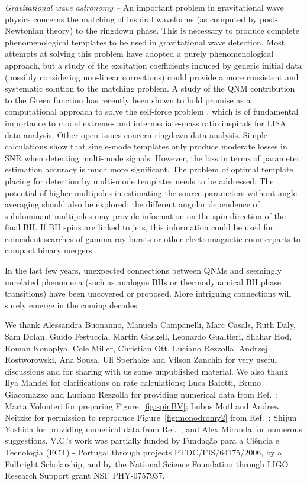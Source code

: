 \documentclass[]{iopart}
\begin{document}
\noindent
{\it Gravitational wave astronomy --} An important problem in gravitational
wave physics concerns the matching of inspiral waveforms (as computed by
post-Newtonian theory) to the ringdown phase. This is necessary to produce
complete phenomenological templates to be used in gravitational wave
detection. Most attempts at solving this problem have adopted a purely
phenomenological approach, but a study of the excitation coefficients induced
by generic initial data (possibly considering non-linear corrections) could
provide a more consistent and systematic solution to the matching problem. A
study of the QNM contribution to the Green function has recently been shown to
hold promise as a computational approach to solve the self-force problem
\cite{Casals:2009zh}, which is of fundamental importance to model extreme- and
intermediate-mass ratio inspirals for LISA data analysis. Other open issues
concern ringdown data analysis. Simple calculations show that single-mode
templates only produce moderate losses in SNR when detecting multi-mode
signals. However, the loss in terms of parameter estimation accuracy is much
more significant. The problem of optimal template placing for detection by
multi-mode templates needs to be addressed. The potential of higher multipoles
in estimating the source parameters without angle-averaging should also be
explored: the different angular dependence of subdominant multipoles may
provide information on the spin direction of the final BH. If BH spins are
linked to jets, this information could be used for coincident searches of
gamma-ray bursts or other electromagnetic counterparts to compact binary
mergers \cite{Kanner:2008zh,Bloom:2009vx}.

In the last few years, unexpected connections between QNMs and seemingly
unrelated phenomena (such as analogue BHs or thermodynamical BH phase
transitions) have been uncovered or proposed. More intriguing connections will
surely emerge in the coming decades.

\ack

We thank Alessandra Buonanno, Manuela Campanelli, Marc Casals, Ruth Daly, Sam
Dolan, Guido Festuccia, Martin Gaskell, Leonardo Gualtieri, Shahar Hod, Roman Konoplya, Cole
Miller, Christian Ott, Luciano Rezzolla, Andrzej Rostworowski, Ana Sousa, Uli
Sperhake and Vilson Zanchin for very useful discussions and for sharing with
us some unpublished material.  We also thank Ilya Mandel for clarifications on
rate calculations; Luca Baiotti, Bruno Giacomazzo and Luciano Rezzolla for
providing numerical data from Ref.~\cite{Baiotti:2008ra}; Marta Volonteri for
preparing Figure~\ref{fig:spinBV}; Lubos Motl and Andrew Neitzke for
permission to reproduce Figure~\ref{fig:monodromy2} from
Ref.~\cite{Motl:2003cd}; Shijun Yoshida for providing numerical data from
Ref.~\cite{Cardoso:2003vt}, and Alex Miranda for numerous suggestions.  V.C.'s
work was partially funded by Funda\c c\~ao para a Ci\^encia e Tecnologia (FCT)
- Portugal through projects PTDC/FIS/64175/2006, by a Fulbright Scholarship,
and by the National Science Foundation through LIGO Research Support grant NSF
PHY-0757937.
\end{document}
